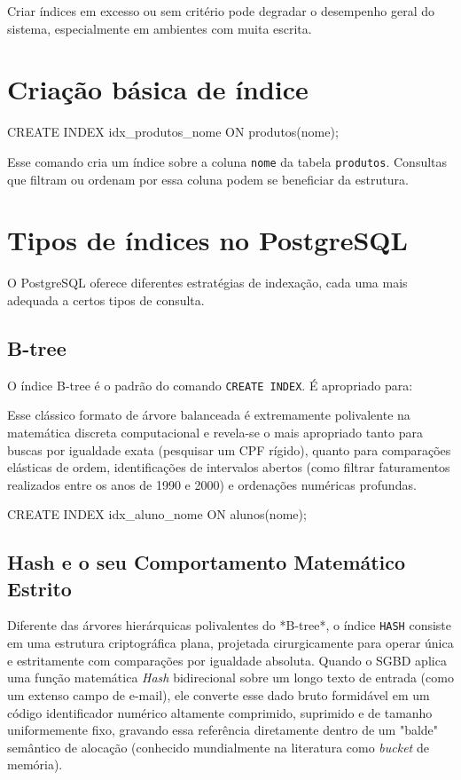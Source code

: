 \begin{danger}
Criar índices em excesso ou sem critério pode degradar o desempenho geral do sistema, especialmente em ambientes com muita escrita.
\end{danger}

\section{Criação básica de índice}

\begin{sqlcode}
CREATE INDEX idx_produtos_nome ON produtos(nome);
\end{sqlcode}

Esse comando cria um índice sobre a coluna \texttt{nome} da tabela \texttt{produtos}. Consultas que filtram ou ordenam por essa coluna podem se beneficiar da estrutura.

\section{Tipos de índices no PostgreSQL}

O PostgreSQL oferece diferentes estratégias de indexação, cada uma mais adequada a certos tipos de consulta.

\subsection{B-tree}

O índice B-tree é o padrão do comando \texttt{CREATE INDEX}. É apropriado para:

Esse clássico formato de árvore balanceada é extremamente polivalente na matemática discreta computacional e revela-se o mais apropriado tanto para buscas por igualdade exata (pesquisar um CPF rígido), quanto para comparações elásticas de ordem, identificações de intervalos abertos (como filtrar faturamentos realizados entre os anos de 1990 e 2000) e ordenações numéricas profundas.

\begin{sqlcode}
CREATE INDEX idx_aluno_nome ON alunos(nome);
\end{sqlcode}

\subsection{Hash e o seu Comportamento Matemático Estrito}

Diferente das árvores hierárquicas polivalentes do *B-tree*, o índice \texttt{HASH} consiste em uma estrutura criptográfica plana, projetada cirurgicamente para operar única e estritamente com comparações por igualdade absoluta. Quando o SGBD aplica uma função matemática \textit{Hash} bidirecional sobre um longo texto de entrada (como um extenso campo de e-mail), ele converte esse dado bruto formidável em um código identificador numérico altamente comprimido, suprimido e de tamanho uniformemente fixo, gravando essa referência diretamente dentro de um "balde" semântico de alocação (conhecido mundialmente na literatura como \textit{bucket} de memória). 

